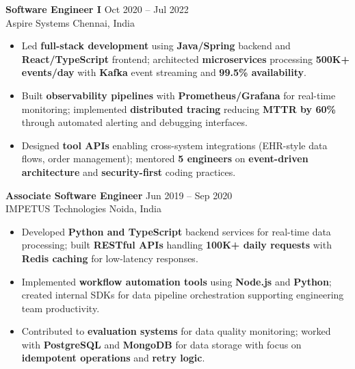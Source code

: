 \documentclass[letterpaper,10pt]{article}
\newcommand{\resumeItem}[1]{\item\small #1}
\newcommand{\resumeSubheading}[4]{
  \vspace{6pt}
  \noindent
  \textbf{#1} \hfill {\footnotesize #2} \\
  [-1pt]
  \noindent
  \small #3 \hfill {\small #4}
  \vspace{3pt}
}
\newcommand{\resumeItemsStart}{\vspace{-2pt}\begin{itemize}}
\newcommand{\resumeItemsEnd}{\end{itemize}\vspace{6pt}}
\begin{document}
\resumeSubheading
{Software Engineer I}{Oct 2020 -- Jul 2022}
{Aspire Systems}{Chennai, India}
\resumeItemsStart
\resumeItem{Led \textbf{full-stack development} using \textbf{Java/Spring} backend and \textbf{React/TypeScript} frontend; architected \textbf{microservices} processing \textbf{500K+ events/day} with \textbf{Kafka} event streaming and \textbf{99.5\% availability}.}
\resumeItem{Built \textbf{observability pipelines} with \textbf{Prometheus/Grafana} for real-time monitoring; implemented \textbf{distributed tracing} reducing \textbf{MTTR by 60\%} through automated alerting and debugging interfaces.}
\resumeItem{Designed \textbf{tool APIs} enabling cross-system integrations (EHR-style data flows, order management); mentored \textbf{5 engineers} on \textbf{event-driven architecture} and \textbf{security-first} coding practices.}
\resumeItemsEnd
\vspace{-12pt}

\resumeSubheading
{Associate Software Engineer}{Jun 2019 -- Sep 2020}
{IMPETUS Technologies}{Noida, India}
\resumeItemsStart
\resumeItem{Developed \textbf{Python and TypeScript} backend services for real-time data processing; built \textbf{RESTful APIs} handling \textbf{100K+ daily requests} with \textbf{Redis caching} for low-latency responses.}
\resumeItem{Implemented \textbf{workflow automation tools} using \textbf{Node.js} and \textbf{Python}; created internal SDKs for data pipeline orchestration supporting engineering team productivity.}
\resumeItem{Contributed to \textbf{evaluation systems} for data quality monitoring; worked with \textbf{PostgreSQL} and \textbf{MongoDB} for data storage with focus on \textbf{idempotent operations} and \textbf{retry logic}.}
\resumeItemsEnd
\vspace{-8pt}


\end{document}
